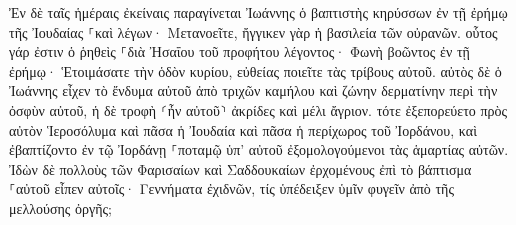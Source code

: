 \documentclass{openreader}
\begin{document}
Ἐν δὲ ταῖς ἡμέραις ἐκείναις παραγίνεται Ἰωάννης ὁ βαπτιστὴς κηρύσσων ἐν τῇ ἐρήμῳ τῆς Ἰουδαίας 
⸀καὶ λέγων· Μετανοεῖτε, ἤγγικεν γὰρ ἡ βασιλεία τῶν οὐρανῶν. 
οὗτος γάρ ἐστιν ὁ ῥηθεὶς ⸀διὰ Ἠσαΐου τοῦ προφήτου λέγοντος· Φωνὴ βοῶντος ἐν τῇ ἐρήμῳ· Ἑτοιμάσατε τὴν ὁδὸν κυρίου, εὐθείας ποιεῖτε τὰς τρίβους αὐτοῦ. 
αὐτὸς δὲ ὁ Ἰωάννης εἶχεν τὸ ἔνδυμα αὐτοῦ ἀπὸ τριχῶν καμήλου καὶ ζώνην δερματίνην περὶ τὴν ὀσφὺν αὐτοῦ, ἡ δὲ τροφὴ ⸂ἦν αὐτοῦ⸃ ἀκρίδες καὶ μέλι ἄγριον. 
τότε ἐξεπορεύετο πρὸς αὐτὸν Ἱεροσόλυμα καὶ πᾶσα ἡ Ἰουδαία καὶ πᾶσα ἡ περίχωρος τοῦ Ἰορδάνου, 
καὶ ἐβαπτίζοντο ἐν τῷ Ἰορδάνῃ ⸀ποταμῷ ὑπ’ αὐτοῦ ἐξομολογούμενοι τὰς ἁμαρτίας αὐτῶν. 
Ἰδὼν δὲ πολλοὺς τῶν Φαρισαίων καὶ Σαδδουκαίων ἐρχομένους ἐπὶ τὸ βάπτισμα ⸀αὐτοῦ εἶπεν αὐτοῖς· Γεννήματα ἐχιδνῶν, τίς ὑπέδειξεν ὑμῖν φυγεῖν ἀπὸ τῆς μελλούσης ὀργῆς; 
\end{document}
